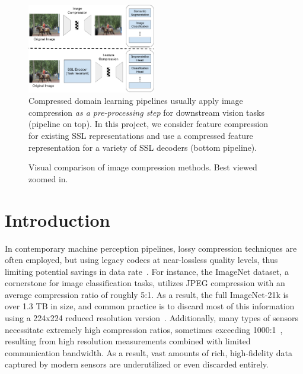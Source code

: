 \documentclass[10pt,twocolumn,letterpaper]{article}
\begin{document}
\begin{figure}[t]
\begin{center}
\includegraphics[width=0.5\textwidth]{Figures/compression-pipelines.png}
\end{center}
\caption{\label{fig:compression-pipelines}%
Compressed domain learning pipelines usually apply image compression \textit{as a pre-processing step} for downstream vision tasks (pipeline on top). In this project, we consider feature compression for existing SSL representations and use a compressed feature representation for a variety of SSL decoders (bottom pipeline).}
\end{figure}

\begin{figure}
\begin{center}
\end{center}
\caption{\label{fig:image_compression_methods}%
Visual comparison of image compression methods. Best viewed zoomed in.}
\end{figure}


\section{Introduction}

In contemporary machine perception pipelines, lossy compression techniques are often employed, but using legacy codecs at near-lossless quality levels, thus limiting potential savings in data rate~\cite{ehrlich2022first}. For instance, the ImageNet dataset, a cornerstone for image classification tasks, utilizes JPEG compression with an average compression ratio of roughly 5:1. As a result, the full ImageNet-21k is over 1.3 TB in size, and common practice is to discard most of this information using a 224x224 reduced resolution version~\cite{ridnik2021imagenet}. Additionally, many types of sensors necessitate extremely high compression ratios, sometimes exceeding 1000:1~\cite{cocker2022low}, resulting from high resolution measurements combined with limited communication bandwidth. As a result, vast amounts of rich, high-fidelity data captured by modern sensors are underutilized or even discarded entirely.
\end{document}
